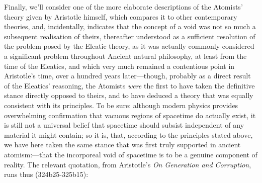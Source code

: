 Finally, we'll consider one of the more elaborate descriptions of the Atomists' theory given by Aristotle himself, which compares it to other contemporary theories, and, incidentally, indicates that the concept of a void was not so much a subsequent realisation of theirs, thereafter understood as a sufficient resolution of the problem posed by the Eleatic theory, as it was actually commonly considered a significant problem throughout Ancient natural philosophy, at least from the time of the Eleatics, and which very much remained a contentious point in Aristotle's time, over a hundred years later---though, probably as a direct result of the Eleatics' reasoning, the Atomists \textit{were} the first to have taken the definitive stance directly opposed to theirs, and to have deduced a theory that was equally consistent with its principles. To be sure: although modern physics provides overwhelming confirmation that vacuous regions of spacetime do actually exist, it is still not a universal belief that spacetime should subsist independent of any material it might contain; so it is, that, according to the principles stated above, we have here taken the same stance that was first truly supported in ancient atomism:---that the incorporeal void of spacetime is to be a genuine component of reality. The relevant quotation, from Aristotle's \textit{On Generation and Corruption}, runs thus \cite{Aristotle1984} (324b25-325b15):
